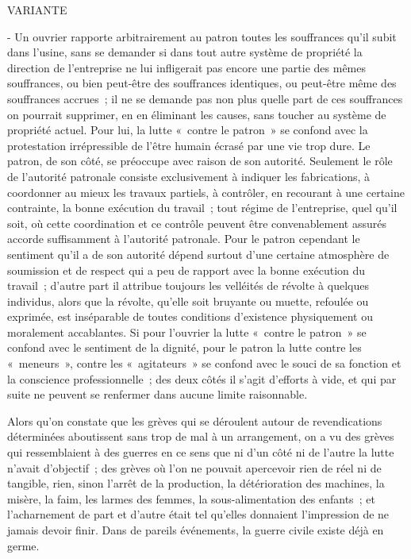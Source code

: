 \documentclass[french,twoside]{book} %
\begin{document}
\begin{center}
VARIANTE\end{center}
 - Un ouvrier rapporte arbitrairement au patron toutes les souffrances qu'il subit dans l'usine, sans se demander si dans tout autre système de propriété la direction de l'entreprise ne lui infligerait pas encore une partie des mêmes souffrances, ou bien peut-être des souffrances identiques, ou peut-être même des souffrances accrues ; il ne se demande pas non plus quelle part de ces souffrances on pourrait supprimer, en en éliminant les causes, sans toucher au système de propriété actuel. Pour lui, la lutte « contre le patron » se confond avec la protestation irrépressible de l'être humain écrasé par une vie trop dure. Le patron, de son côté, se préoccupe avec raison de son autorité. Seulement le rôle de l'autorité patronale consiste exclusivement à indiquer les fabrications, à coordonner au mieux les travaux partiels, à contrôler, en recourant à une certaine contrainte, la bonne exécution du travail ; tout régime de l'entreprise, quel qu'il soit, où cette coordination et ce contrôle peuvent être convenablement assurés accorde suffisamment à l'autorité patronale. Pour le patron cependant le sentiment qu'il a de son autorité dépend surtout d'une certaine atmosphère de soumission et de respect qui a peu de rapport avec la bonne exécution du travail ; d'autre part il attribue toujours les velléités de révolte à quelques individus, alors que la révolte, qu'elle soit bruyante ou muette, refoulée ou exprimée, est inséparable de toutes conditions d'existence physiquement ou moralement accablantes. Si pour l'ouvrier la lutte « contre le patron » se confond avec le sentiment de la dignité, pour le patron la lutte contre les « meneurs », contre les « agitateurs » se confond avec le souci de sa fonction et la conscience professionnelle ; des deux côtés il s'agit d'efforts à vide, et qui par suite ne peuvent se renfermer dans aucune limite raisonnable.\par
Alors qu'on constate que les grèves qui se déroulent autour de revendications déterminées aboutissent sans trop de mal à un arrangement, on a vu des grèves qui ressemblaient à des guerres en ce sens que ni d'un côté ni de l'autre la lutte n'avait d'objectif ; des grèves où l'on ne pouvait apercevoir rien de réel ni de tangible, rien, sinon l'arrêt de la production, la détérioration des machines, la misère, la faim, les larmes des femmes, la sous-alimentation des enfants ; et l'acharnement de part et d'autre était tel qu'elles donnaient l'impression de ne jamais devoir finir. Dans de pareils événements, la guerre civile existe déjà en germe.\par
\end{document}
